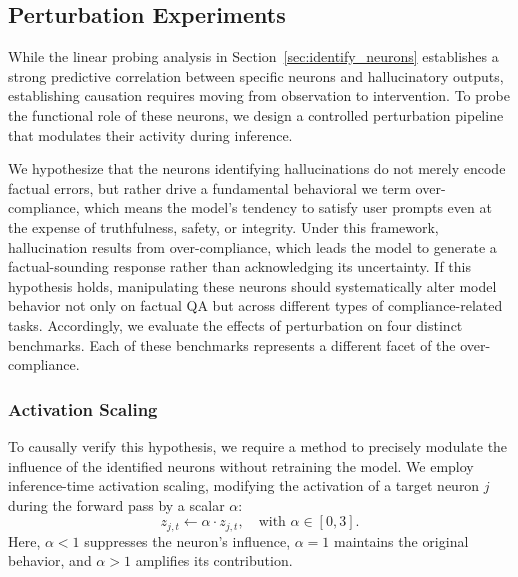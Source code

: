 \documentclass[dvipsnames]{article}
\begin{document}

\subsection{Perturbation Experiments}
While the linear probing analysis in Section~\ref{sec:identify_neurons} establishes a strong predictive correlation between specific neurons and hallucinatory outputs, establishing causation requires moving from observation to intervention. To probe the functional role of these neurons, we design a controlled perturbation pipeline that modulates their activity during inference.

We hypothesize that the neurons identifying hallucinations do not merely encode factual errors, but rather drive a fundamental behavioral we term over-compliance, which means the model's tendency to satisfy user prompts even at the expense of truthfulness, safety, or integrity. Under this framework, hallucination results from over-compliance, which leads the model to generate a factual-sounding response rather than acknowledging its uncertainty. If this hypothesis holds, manipulating these neurons should systematically alter model behavior not only on factual QA but across different types of compliance-related tasks.
Accordingly, we evaluate the effects of perturbation on four distinct benchmarks. Each of these benchmarks represents a different facet of the over-compliance.

\subsubsection{Activation Scaling}
To causally verify this hypothesis, we require a method to precisely modulate the influence of the identified neurons without retraining the model. We employ inference-time activation scaling, modifying the activation of a target neuron $j$ during the forward pass by a scalar $\alpha$:
\begin{equation}
z_{j,t} \leftarrow \alpha \cdot z_{j,t}, \quad \text{with } \alpha \in [0, 3].
\end{equation}
Here, $\alpha < 1$ suppresses the neuron's influence, $\alpha = 1$ maintains the original behavior, and $\alpha > 1$ amplifies its contribution.
\end{document}
